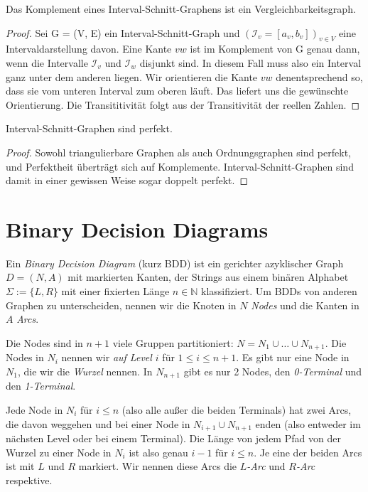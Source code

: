 \documentclass[../main.tex]{subfiles}
\begin{document}
\begin{satz}
    Das Komplement eines Interval-Schnitt-Graphens ist ein Vergleichbarkeitsgraph.
\end{satz}
\begin{proof}
    Sei G = (V, E) ein Interval-Schnitt-Graph und $(\mathcal I_v = [a_v, b_v])_{v\in V}$ eine Intervaldarstellung davon. Eine Kante $vw$ ist im Komplement von G genau dann, wenn die Intervalle $\mathcal I_v$ und $\mathcal I_w$ disjunkt sind. In diesem Fall muss also ein Interval ganz unter dem anderen liegen. Wir orientieren die Kante $vw$ denentsprechend so, dass sie vom unteren Interval zum oberen läuft. Das liefert uns die gewünschte Orientierung. Die Transititivität folgt aus der Transitivität der reellen Zahlen.
\end{proof}

\begin{satz}
    Interval-Schnitt-Graphen sind perfekt.
\end{satz}
\begin{proof}
    Sowohl triangulierbare Graphen als auch Ordnungsgraphen sind perfekt, und Perfektheit überträgt sich auf Komplemente. Interval-Schnitt-Graphen sind damit in einer gewissen Weise sogar doppelt perfekt.
\end{proof}




\section{Binary Decision Diagrams}

Ein \emph{Binary Decision Diagram} (kurz BDD) ist ein gerichter azyklischer Graph $D = (N, A)$ mit markierten Kanten, der Strings aus einem binären Alphabet $\Sigma := \{L, R\}$ mit einer fixierten Länge $n \in \mathbb N$ klassifiziert. Um BDDs von anderen Graphen zu unterscheiden, nennen wir die Knoten in $N$ \emph{Nodes} und die Kanten in $A$ \emph{Arcs}.

Die Nodes sind in $n+1$ viele Gruppen partitioniert: $N = N_1 \cup \hdots \cup N_{n+1}$. Die Nodes in $N_i$ nennen wir \emph{auf Level $i$} für $1 \leq i \leq n+1$. Es gibt nur eine Node in $N_1$, die wir die \emph{Wurzel} nennen. In $N_{n+1}$ gibt es nur 2 Nodes, den \emph{0-Terminal} und den \emph{1-Terminal}.

Jede Node in $N_i$ für $i \leq n$ (also alle außer die beiden Terminals) hat zwei Arcs, die davon weggehen und bei einer Node in $N_{i+1} \cup N_{n+1}$ enden (also entweder im nächsten Level oder bei einem Terminal). Die Länge von jedem Pfad von der Wurzel zu einer Node in $N_i$ ist also genau $i-1$ für $i \leq n$. Je eine der beiden Arcs ist mit $L$ und $R$ markiert. Wir nennen diese Arcs die \emph{$L$-Arc} und \emph{$R$-Arc} respektive.
\end{document}
